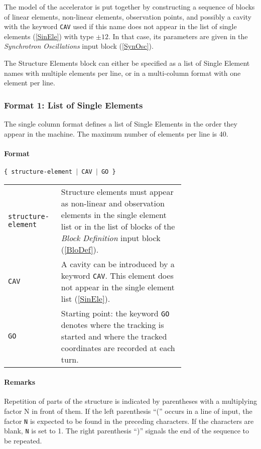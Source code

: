 The model of the accelerator is put together by constructing a sequence of blocks of linear elements, non-linear elements, observation points, and possibly a cavity with the keyword \texttt{CAV} used if this name does not appear in the list of single elements (\ref{SinEle}) with type $\pm 12$.
In that case, its parameters are given in the \textit{Synchrotron Oscillations} input block (\ref{SynOsc}).

The Structure Elements block can either be specified as a list of Single Element names with multiple elements per line, or in a multi-column format with one element per line.

\subsubsection{Format 1: List of Single Elements}

The single column format defines a list of Single Elements in the order they appear in the machine.
The maximum number of elements per line is 40.

\paragraph{Format} \texttt{\{ structure-element $\vert$ CAV $\vert$ GO \}}

\bigskip
\begin{longtabu}{@{}lp{0.70\linewidth}}
    \texttt{structure-element} & Structure elements must appear as non-linear and observation elements in the single element list or in the list of blocks of the \textit{Block Definition} input block (\ref{BloDef}). \\
    \texttt{CAV} & A cavity can be introduced by a keyword \texttt{CAV}. This element does not appear in the single element list   (\ref{SinEle}). \\
    \texttt{GO} & Starting point: the keyword \texttt{GO} denotes where the tracking is started and where the tracked coordinates are recorded at each turn.
\end{longtabu}

\paragraph{Remarks}
Repetition of parts of the structure is indicated by parentheses with a multiplying factor N in front of them.
If the left parenthesis ``('' occurs in a line of input, the factor \texttt{N} is expected to be found in the preceding characters.
If the characters are blank, \texttt{N} is set to 1.
The right parenthesis ``)'' signals the end of the sequence to be repeated.

